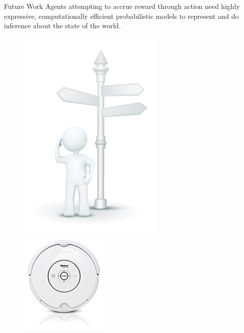 \documentclass[xcolor=dvipsnames]{beamer}
\begin{document}
\begin{frame}[t]{Future Work}
Agents attempting to accrue reward through action need highly expressive, computationally efficient probabilistic models to represent and do inference about the state of the world.
\begin{figure}[htbp]
\begin{center}
\includegraphics[width = .25\textwidth, transparent]{stock/39298bupheonw6vt.png}
\hspace{2cm}
\includegraphics[width = .125\textwidth, transparent]{stock/iRobot_Roomba_530_270x310t.png}
\label{fig:actors}
\end{center}
\end{figure}
\vspace{.25cm}

\end{frame}

%
\end{document}

